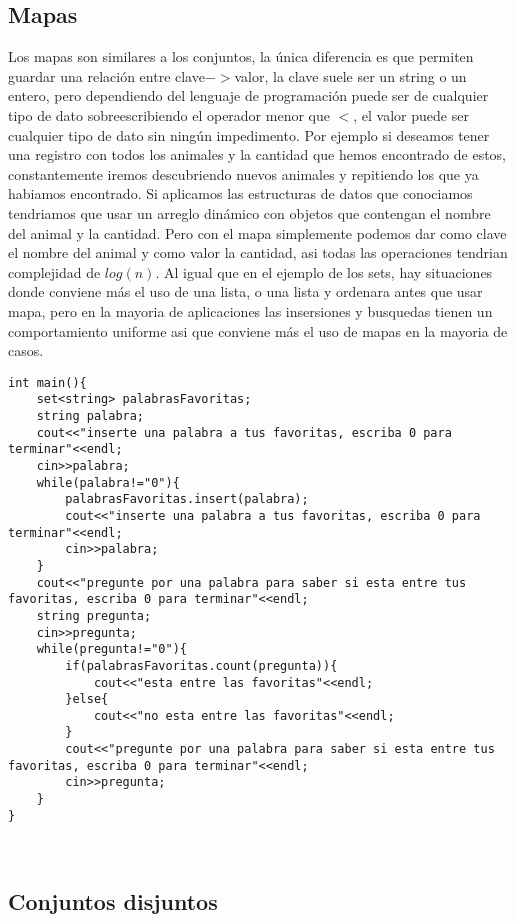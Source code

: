 \subsection{Mapas}
Los mapas son similares a los conjuntos, la única diferencia es que permiten guardar una relación entre clave$->$valor, la clave suele ser un string o un entero, pero dependiendo del lenguaje de programación puede ser de cualquier tipo de dato sobreescribiendo el operador menor que $<$, el valor puede ser cualquier tipo de dato sin ningún impedimento.
Por ejemplo si deseamos tener una registro con todos los animales y la cantidad que hemos encontrado de estos, constantemente iremos descubriendo nuevos animales y repitiendo los que ya habiamos encontrado. Si aplicamos las estructuras de datos que conociamos tendriamos que usar un arreglo dinámico con objetos que contengan el nombre del animal y la cantidad. Pero con el mapa simplemente podemos dar como clave el nombre del animal y como valor la cantidad, asi todas las operaciones tendrian complejidad de $log(n)$. Al igual que en el ejemplo de los sets, hay situaciones donde conviene más el uso de una lista, o una lista y ordenara antes que usar mapa, pero en la mayoria de aplicaciones las insersiones y busquedas tienen un comportamiento uniforme asi que conviene más el uso de mapas en la mayoria de casos.
\\\begin{minipage}{\textwidth}
\begin{lstlisting}[style=C,caption=conjunto.cpp]
int main(){
    set<string> palabrasFavoritas;
    string palabra;
    cout<<"inserte una palabra a tus favoritas, escriba 0 para terminar"<<endl;
    cin>>palabra;
    while(palabra!="0"){
        palabrasFavoritas.insert(palabra);
        cout<<"inserte una palabra a tus favoritas, escriba 0 para terminar"<<endl;
        cin>>palabra;
    }
    cout<<"pregunte por una palabra para saber si esta entre tus favoritas, escriba 0 para terminar"<<endl;
    string pregunta;
    cin>>pregunta;
    while(pregunta!="0"){
        if(palabrasFavoritas.count(pregunta)){
            cout<<"esta entre las favoritas"<<endl;
        }else{
            cout<<"no esta entre las favoritas"<<endl;
        }
        cout<<"pregunte por una palabra para saber si esta entre tus favoritas, escriba 0 para terminar"<<endl;
        cin>>pregunta;
    }
}
\end{lstlisting}
\end{minipage}
\\\subsection{Conjuntos disjuntos}
